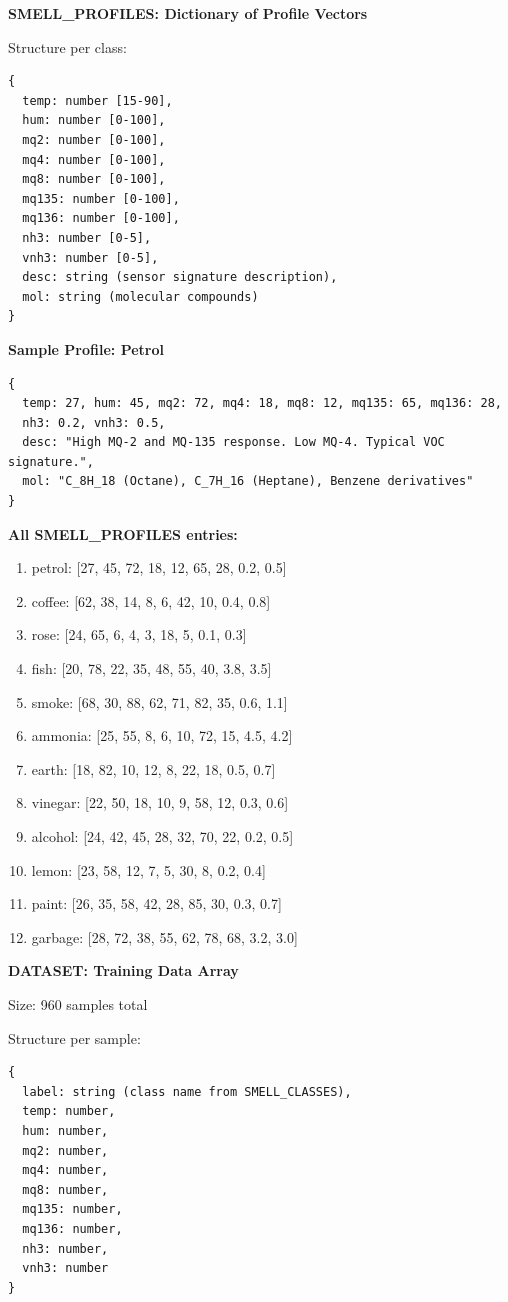 \documentclass[12pt,a4paper]{article}
\begin{document}
\textbf{SMELL\_PROFILES: Dictionary of Profile Vectors}

Structure per class:
\begin{verbatim}
{
  temp: number [15-90],
  hum: number [0-100],
  mq2: number [0-100],
  mq4: number [0-100],
  mq8: number [0-100],
  mq135: number [0-100],
  mq136: number [0-100],
  nh3: number [0-5],
  vnh3: number [0-5],
  desc: string (sensor signature description),
  mol: string (molecular compounds)
}
\end{verbatim}

\textbf{Sample Profile: Petrol}
\begin{verbatim}
{
  temp: 27, hum: 45, mq2: 72, mq4: 18, mq8: 12, mq135: 65, mq136: 28,
  nh3: 0.2, vnh3: 0.5,
  desc: "High MQ-2 and MQ-135 response. Low MQ-4. Typical VOC signature.",
  mol: "C_8H_18 (Octane), C_7H_16 (Heptane), Benzene derivatives"
}
\end{verbatim}

\textbf{All SMELL\_PROFILES entries:}
\begin{enumerate}
    \item petrol: [27, 45, 72, 18, 12, 65, 28, 0.2, 0.5]
    \item coffee: [62, 38, 14, 8, 6, 42, 10, 0.4, 0.8]
    \item rose: [24, 65, 6, 4, 3, 18, 5, 0.1, 0.3]
    \item fish: [20, 78, 22, 35, 48, 55, 40, 3.8, 3.5]
    \item smoke: [68, 30, 88, 62, 71, 82, 35, 0.6, 1.1]
    \item ammonia: [25, 55, 8, 6, 10, 72, 15, 4.5, 4.2]
    \item earth: [18, 82, 10, 12, 8, 22, 18, 0.5, 0.7]
    \item vinegar: [22, 50, 18, 10, 9, 58, 12, 0.3, 0.6]
    \item alcohol: [24, 42, 45, 28, 32, 70, 22, 0.2, 0.5]
    \item lemon: [23, 58, 12, 7, 5, 30, 8, 0.2, 0.4]
    \item paint: [26, 35, 58, 42, 28, 85, 30, 0.3, 0.7]
    \item garbage: [28, 72, 38, 55, 62, 78, 68, 3.2, 3.0]
\end{enumerate}

\textbf{DATASET: Training Data Array}

Size: 960 samples total

Structure per sample:
\begin{verbatim}
{
  label: string (class name from SMELL_CLASSES),
  temp: number,
  hum: number,
  mq2: number,
  mq4: number,
  mq8: number,
  mq135: number,
  mq136: number,
  nh3: number,
  vnh3: number
}
\end{verbatim}
\end{document}
